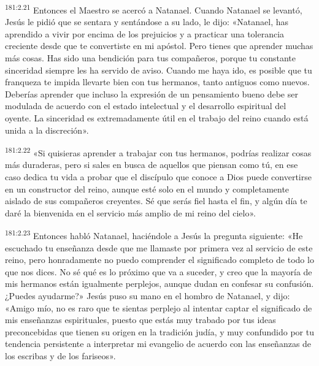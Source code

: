 \par
\textsuperscript{181:2.21} Entonces el Maestro se acercó a Natanael. Cuando Natanael se levantó, Jesús le pidió que se sentara y sentándose a su lado, le dijo: «Natanael, has aprendido a vivir por encima de los prejuicios y a practicar una tolerancia creciente desde que te convertiste en mi apóstol. Pero tienes que aprender muchas más cosas. Has sido una bendición para tus compañeros, porque tu constante sinceridad siempre les ha servido de aviso. Cuando me haya ido, es posible que tu franqueza te impida llevarte bien con tus hermanos, tanto antiguos como nuevos. Deberías aprender que incluso la expresión de un pensamiento bueno debe ser modulada de acuerdo con el estado intelectual y el desarrollo espiritual del oyente. La sinceridad es extremadamente útil en el trabajo del reino cuando está unida a la discreción».

\par
\textsuperscript{181:2.22} «Si quisieras aprender a trabajar con tus hermanos, podrías realizar cosas más duraderas, pero si sales en busca de aquellos que piensan como tú, en ese caso dedica tu vida a probar que el discípulo que conoce a Dios puede convertirse en un constructor del reino, aunque esté solo en el mundo y completamente aislado de sus compañeros creyentes. Sé que serás fiel hasta el fin, y algún día te daré la bienvenida en el servicio más amplio de mi reino del cielo».

\par
\textsuperscript{181:2.23} Entonces habló Natanael, haciéndole a Jesús la pregunta siguiente: «He escuchado tu enseñanza desde que me llamaste por primera vez al servicio de este reino, pero honradamente no puedo comprender el significado completo de todo lo que nos dices. No sé qué es lo próximo que va a suceder, y creo que la mayoría de mis hermanos están igualmente perplejos, aunque dudan en confesar su confusión. ¿Puedes ayudarme?» Jesús puso su mano en el hombro de Natanael, y dijo: «Amigo mío, no es raro que te sientas perplejo al intentar captar el significado de mis enseñanzas espirituales, puesto que estás muy trabado por tus ideas preconcebidas que tienen su origen en la tradición judía, y muy confundido por tu tendencia persistente a interpretar mi evangelio de acuerdo con las enseñanzas de los escribas y de los fariseos».

